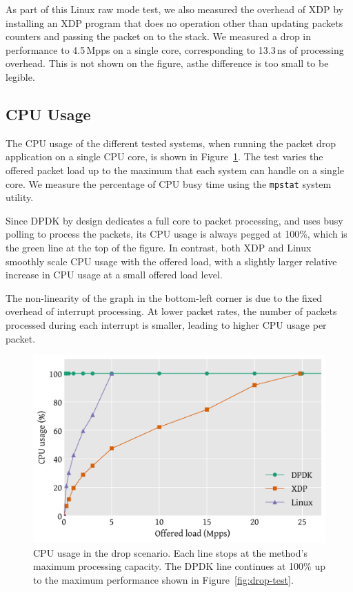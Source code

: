 \documentclass[sigconf]{acmart}
\begin{document}
As part of this Linux raw mode test, we also measured the overhead of XDP by
installing an XDP program that does no operation other than updating packets
counters and passing the packet on to the stack. We measured a drop in
performance to 4.5\,Mpps on a single core, corresponding to 13.3\,ns of
processing overhead. This is not shown on the figure, asthe difference is too
small to be legible.

\subsection{CPU Usage}
\label{sec:cpu-usage}

The CPU usage of the different tested systems, when running the packet drop
application on a single CPU core, is shown in Figure~\ref{fig:drop-cpu}. The
test varies the offered packet load up to the maximum that each system can
handle on a single core. We measure the percentage of CPU busy time using the
\texttt{mpstat} system utility.

Since DPDK by design dedicates a full core to packet processing, and uses busy
polling to process the packets, its CPU usage is always pegged at 100\%, which
is the green line at the top of the figure. In contrast, both XDP and Linux
smoothly scale CPU usage with the offered load, with a slightly larger relative
increase in CPU usage at a small offered load level.

The non-linearity of the graph in the bottom-left corner is due to the fixed
overhead of interrupt processing. At lower packet rates, the number of packets
processed during each interrupt is smaller, leading to higher CPU usage per
packet.

\begin{figure}[t]
\centering
\includegraphics[width=\linewidth]{figures/drop-cpu.pdf}
\caption{\label{fig:drop-cpu} CPU usage in the drop scenario. Each line stops at
  the method's maximum processing capacity. The DPDK line continues at 100\% up
  to the maximum performance shown in Figure~\ref{fig:drop-test}.}
\end{figure}
\end{document}
